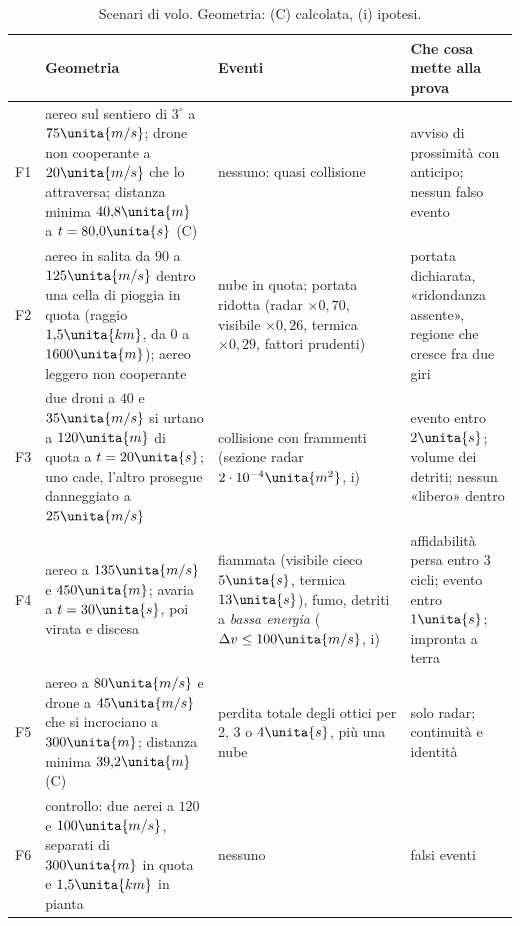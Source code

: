 \begin{table}[H]\centering\footnotesize
\caption{Scenari di volo. Geometria: (C) calcolata, (i) ipotesi.}\label{tab:vo-scenari}
\begin{tabularx}{\linewidth}{@{}p{0.6cm}>{\RaggedRight\arraybackslash}p{6.4cm}>{\RaggedRight\arraybackslash}p{3.2cm}L@{}}
\toprule
& Geometria & Eventi & Che cosa mette alla prova\\
\midrule
F1 & aereo sul sentiero di $3^\circ$ a $75\unita{m/s}$; drone non cooperante a $20\unita{m/s}$ che lo attraversa; distanza minima $40{,}8\unita{m}$ a $t=80{,}0\unita{s}$ (C) & nessuno: quasi collisione & avviso di prossimità con anticipo; nessun falso evento\\
F2 & aereo in salita da $90$ a $125\unita{m/s}$ dentro una cella di pioggia in quota (raggio $1{,}5\unita{km}$, da $0$ a $1600\unita{m}$); aereo leggero non cooperante & nube in quota; portata ridotta (radar $\times0{,}70$, visibile $\times0{,}26$, termica $\times0{,}29$, fattori prudenti) & portata dichiarata, «ridondanza assente», regione che cresce fra due giri\\
F3 & due droni a $40$ e $35\unita{m/s}$ si urtano a $120\unita{m}$ di quota a $t=20\unita{s}$; uno cade, l'altro prosegue danneggiato a $25\unita{m/s}$ & collisione con frammenti (sezione radar $2\cdot10^{-4}\unita{m^2}$, i) & evento entro $2\unita{s}$; volume dei detriti; nessun «libero» dentro\\
F4 & aereo a $135\unita{m/s}$ e $450\unita{m}$; avaria a $t=30\unita{s}$, poi virata e discesa & fiammata (visibile cieco $5\unita{s}$, termica $13\unita{s}$), fumo, detriti a \emph{bassa energia} ($\Delta v\le100\unita{m/s}$, i) & affidabilità persa entro 3 cicli; evento entro $1\unita{s}$; impronta a terra\\
F5 & aereo a $80\unita{m/s}$ e drone a $45\unita{m/s}$ che si incrociano a $300\unita{m}$; distanza minima $39{,}2\unita{m}$ (C) & perdita totale degli ottici per 2, 3 o $4\unita{s}$, più una nube & solo radar; continuità e identità\\
F6 & controllo: due aerei a $120$ e $100\unita{m/s}$, separati di $300\unita{m}$ in quota e $1{,}5\unita{km}$ in pianta & nessuno & falsi eventi\\
\bottomrule
\end{tabularx}
\end{table}

